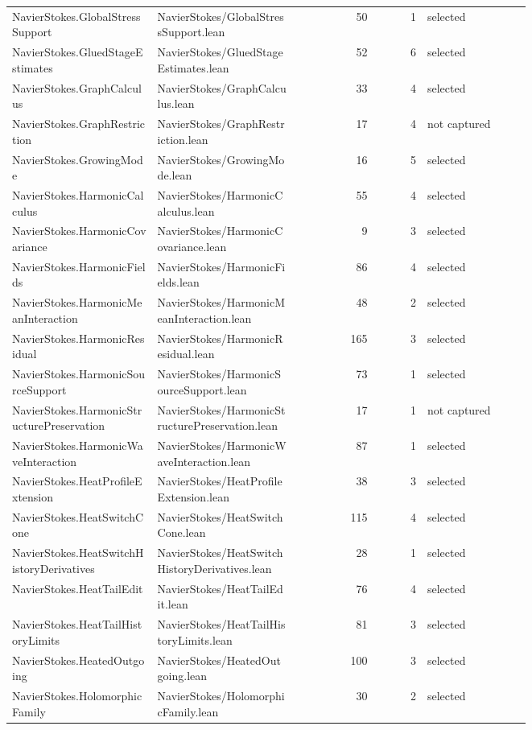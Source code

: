 \documentclass[10pt]{article}
\begin{document}
\begin{longtable}{p{0.28\linewidth}p{0.27\linewidth}r r p{0.20\linewidth}}
NavierStokes.GlobalStressSupport & NavierStokes/GlobalStressSupport.lean & 50 & 1 & selected\\
NavierStokes.GluedStageEstimates & NavierStokes/GluedStageEstimates.lean & 52 & 6 & selected\\
NavierStokes.GraphCalculus & NavierStokes/GraphCalculus.lean & 33 & 4 & selected\\
NavierStokes.GraphRestriction & NavierStokes/GraphRestriction.lean & 17 & 4 & not captured\\
NavierStokes.GrowingMode & NavierStokes/GrowingMode.lean & 16 & 5 & selected\\
NavierStokes.HarmonicCalculus & NavierStokes/HarmonicCalculus.lean & 55 & 4 & selected\\
NavierStokes.HarmonicCovariance & NavierStokes/HarmonicCovariance.lean & 9 & 3 & selected\\
NavierStokes.HarmonicFields & NavierStokes/HarmonicFields.lean & 86 & 4 & selected\\
NavierStokes.HarmonicMeanInteraction & NavierStokes/HarmonicMeanInteraction.lean & 48 & 2 & selected\\
NavierStokes.HarmonicResidual & NavierStokes/HarmonicResidual.lean & 165 & 3 & selected\\
NavierStokes.HarmonicSourceSupport & NavierStokes/HarmonicSourceSupport.lean & 73 & 1 & selected\\
NavierStokes.HarmonicStructurePreservation & NavierStokes/HarmonicStructurePreservation.lean & 17 & 1 & not captured\\
NavierStokes.HarmonicWaveInteraction & NavierStokes/HarmonicWaveInteraction.lean & 87 & 1 & selected\\
NavierStokes.HeatProfileExtension & NavierStokes/HeatProfileExtension.lean & 38 & 3 & selected\\
NavierStokes.HeatSwitchCone & NavierStokes/HeatSwitchCone.lean & 115 & 4 & selected\\
NavierStokes.HeatSwitchHistoryDerivatives & NavierStokes/HeatSwitchHistoryDerivatives.lean & 28 & 1 & selected\\
NavierStokes.HeatTailEdit & NavierStokes/HeatTailEdit.lean & 76 & 4 & selected\\
NavierStokes.HeatTailHistoryLimits & NavierStokes/HeatTailHistoryLimits.lean & 81 & 3 & selected\\
NavierStokes.HeatedOutgoing & NavierStokes/HeatedOutgoing.lean & 100 & 3 & selected\\
NavierStokes.HolomorphicFamily & NavierStokes/HolomorphicFamily.lean & 30 & 2 & selected\\

\end{longtable}
\end{document}
